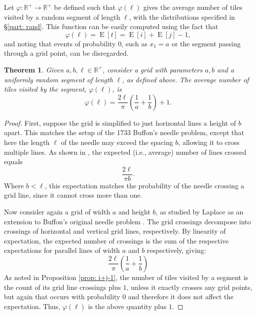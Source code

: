 \documentclass[12pt, a4paper]{article}
\DeclareMathOperator{\E}{E}
\newcommand{\funta}{\varphi} %
\newcommand{\len}{\ell} %
\newcommand{\tiles}{t} %
\newtheorem{theorem}{Theorem}%
\begin{document}
Let $\funta: \mathbb R^+ \to \mathbb R^+$ be defined such that $\funta(\len)$ gives the average number of tiles visited by a random segment of length $\len$, with the distributions specified in \S\ref{part: rand}. This function can be easily computed using the fact that
\begin{equation}
\label{eq: funta E[i] E[j]}
\funta(\len) = \E[\tiles] = \E[i]+\E[j]-1,
\end{equation}
and noting that events of probability $0$, such as $x_1=a$ or the segment passing through a grid point, can be disregarded.

\begin{theorem}
\label{theo: funta, form}
Given $a, b, \len \in \mathbb R^+$, consider a grid with parameters $a, b$ and a uniformly random segment of length $\len$, as defined above. The average number of tiles visited by the segment, $\funta(\len)$, is 
\begin{equation}
\label{eq: funta, form}
\funta(\len) = \frac{2\len}{\pi}\left(\frac 1 a + \frac 1 b\right) + 1.
\end{equation}
\end{theorem}

\begin{proof}
First, suppose the grid is simplified to just horizontal lines a height of $b$ apart. This matches the setup of the 1733 Buffon's needle problem, except that here the length $\len$ of the needle may exceed the spacing $b$, allowing it to cross multiple lines. As shown in \cite{Ramaley69}, the expected (i.e., average) number of lines crossed equals
$$ \frac{2\len}{\pi b}.$$
Where $b<\len$, this expectation matches the probability of the needle crossing a grid line, since it cannot cross more than one.

Now consider again a grid of width $a$ and height $b$, as studied by Laplace as an extension to Buffon's original needle problem \cite{Arnow94}. The grid crossings decompose into crossings of horizontal and vertical grid lines, respectively. By linearity of expectation, the expected number of crossings is the sum of the respective expectations for parallel lines of width $a$ and $b$ respectively, giving:
\[
\frac{2\len}{\pi}\left(\frac 1 a + \frac 1 b\right)
\]
As noted in Proposition \ref{prop: i+j-1}, the number of tiles visited by a segment is the count of its grid line crossings plus $1$, unless it exactly crosses any grid points, but again that occurs with probability $0$ and therefore it does not affect the expectation. Thus, $\funta(\len)$ is the above quantity plus $1$.
\end{proof}
\end{document}
